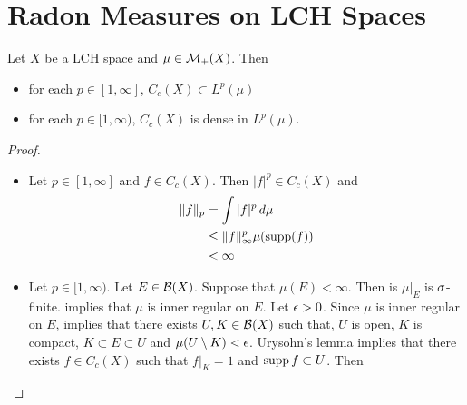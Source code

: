 \documentclass{book}
\begin{document}
	
	
	
	
	
	
	
	
	
	
	
	
	
	
	
	
	
	
	
	
	
	
	
	
	
	
	
	
	
	
	
	
	
	
	
	
	
	
	
	\newpage	
	\section{Radon Measures on LCH Spaces}
	
	
	\begin{ex}  
		Let $X$ be a LCH space and $\mu \in \mathcal{M}_+(X)$. Then 
		\begin{itemize}
			\item for each $p \in [1, \infty]$, $C_c(X) \subset L^p(\mu)$
			\item for each $p \in [1, \infty)$, $C_c(X)$ is dense in $L^p(\mu)$.
		\end{itemize}
	\end{ex}
	
	\begin{proof}\
		\begin{itemize}
			\item Let $p \in [1, \infty]$ and $f \in C_c(X)$. Then $|f|^p \in C_c(X)$ and 
			\begin{align*}
				\|f\|_p 
				&= \int |f|^p \, d \mu \\
				& \leq \|f\|_{\infty}^p \mu(\operatorname{supp} (f)) \\
				& < \infty
			\end{align*}	 
			\item Let $p \in [1, \infty)$. Let $E \in \mathcal{B}(X)$. Suppose that $\mu(E) < \infty$. Then is $\mu|_E$ is $\sigma$-finite.  implies that $\mu$ is inner regular on $E$. Let $\epsilon > 0$. Since $\mu$ is inner regular on $E$,  implies that there exists $U,K \in \mathcal{B}(X)$ such that, $U$ is open, $K$ is compact, $K \subset E \subset U$ and  $\mu(U \setminus K) < \epsilon$. Urysohn's lemma implies that there exists $f \in C_c(X)$ such that $f|_K = 1$ and $\operatorname{supp} f \subset U$. Then \\
			\tcb{FINISH!!!}
		\end{itemize}
	\end{proof}
	
\end{document}
